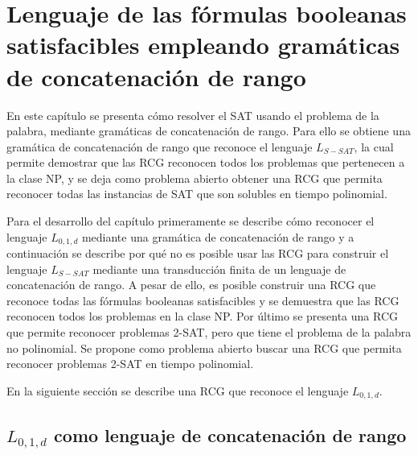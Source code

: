 


\chapter{Lenguaje de las fórmulas booleanas satisfacibles empleando gramáticas de concatenación de rango}
\label{chap:LSATRCG}

En este capítulo se presenta cómo resolver el SAT usando el problema de la palabra, mediante gramáticas de 
concatenación de rango. Para ello se obtiene una gramática de concatenación de rango que reconoce el lenguaje $L_{S-SAT}$, la cual permite demostrar que las RCG reconocen todos los problemas que pertenecen a la clase NP, y se deja como problema abierto obtener una RCG que permita reconocer todas las instancias de SAT que son solubles en tiempo polinomial.

Para el desarrollo del capítulo primeramente se describe cómo reconocer el lenguaje $L_{0,1,d}$ mediante una gramática de concatenación de rango y a continuación se describe por qué no es posible usar las RCG para construir el lenguaje $L_{S-SAT}$ mediante una transducción finita de un lenguaje de concatenación de rango. A pesar de ello, es posible construir una RCG que reconoce todas las fórmulas booleanas satisfacibles y se demuestra que las RCG reconocen todos los problemas en la clase NP. Por último se presenta una RCG que permite reconocer problemas 2-SAT, pero que tiene el problema de la palabra no polinomial. Se propone como problema abierto buscar una RCG que permita reconocer problemas 2-SAT en tiempo polinomial.

En la siguiente sección se describe una RCG que reconoce el lenguaje $L_{0,1,d}$.

\section{$L_{0,1,d}$ como lenguaje de concatenación de rango}


